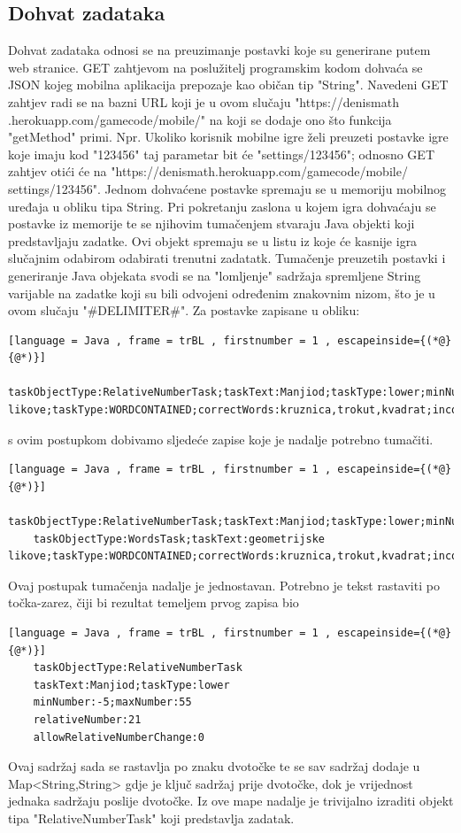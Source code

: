 \documentclass[times, utf8, zavrsni]{fer}
\begin{document}
	\subsection{Dohvat zadataka}
	Dohvat zadataka odnosi se na preuzimanje postavki koje su generirane putem web stranice. GET zahtjevom na poslužitelj programskim kodom dohvaća se JSON kojeg mobilna aplikacija prepozaje kao običan tip "String".
	Navedeni GET zahtjev radi se na bazni URL koji je u ovom slučaju "https://denismath .herokuapp.com/gamecode/mobile/" na koji se dodaje ono što funkcija "getMethod" primi. Npr. Ukoliko korisnik mobilne igre želi preuzeti postavke
	igre koje imaju kod "123456"  taj parametar bit će "settings/123456"; odnosno GET zahtjev otići će na "https://denismath.herokuapp.com/gamecode/mobile/ settings/123456".
	Jednom dohvaćene postavke spremaju se u memoriju mobilnog uređaja u obliku tipa String. Pri pokretanju zaslona u kojem igra dohvaćaju se postavke iz memorije te se njihovim tumačenjem stvaraju Java objekti koji predstavljaju zadatke.
	Ovi objekt spremaju se u listu iz koje će kasnije igra slučajnim odabirom odabirati trenutni zadatatk. Tumačenje preuzetih postavki i generiranje Java objekata svodi se na "lomljenje" sadržaja spremljene String varijable
	na zadatke koji su bili odvojeni određenim znakovnim nizom, što je u ovom slučaju "\#DELIMITER\#".
	Za postavke zapisane u obliku:
	
	
	\begin{lstlisting}[language = Java , frame = trBL , firstnumber = 1 , escapeinside={(*@}{@*)}]
	taskObjectType:RelativeNumberTask;taskText:Manjiod;taskType:lower;minNumber:-5;maxNumber:55;relativeNumber:21;allowRelativeNumberChange:0#DELIMITER#taskObjectType:WordsTask;taskText:geometrijske likove;taskType:WORDCONTAINED;correctWords:kruznica,trokut,kvadrat;incorrectWords:piramida,valjak,sfera
	\end{lstlisting}
	s ovim postupkom dobivamo sljedeće zapise koje je nadalje potrebno tumačiti.
	\begin{lstlisting}[language = Java , frame = trBL , firstnumber = 1 , escapeinside={(*@}{@*)}]
	taskObjectType:RelativeNumberTask;taskText:Manjiod;taskType:lower;minNumber:-5;maxNumber:55;relativeNumber:21;allowRelativeNumberChange:0
	taskObjectType:WordsTask;taskText:geometrijske likove;taskType:WORDCONTAINED;correctWords:kruznica,trokut,kvadrat;incorrectWords:piramida,valjak,sfera
	\end{lstlisting}
	Ovaj postupak tumačenja nadalje je jednostavan. Potrebno je tekst rastaviti po točka-zarez, čiji bi rezultat temeljem prvog zapisa bio
	\begin{lstlisting}[language = Java , frame = trBL , firstnumber = 1 , escapeinside={(*@}{@*)}]
	taskObjectType:RelativeNumberTask
	taskText:Manjiod;taskType:lower
	minNumber:-5;maxNumber:55
	relativeNumber:21
	allowRelativeNumberChange:0
	\end{lstlisting}
	Ovaj sadržaj sada se rastavlja po znaku dvotočke te se sav sadržaj dodaje u Map<String,String> gdje je ključ sadržaj prije dvotočke, dok je vrijednost jednaka sadržaju poslije dvotočke.
	Iz ove mape nadalje je trivijalno izraditi objekt tipa "RelativeNumberTask" koji predstavlja zadatak. 
\end{document}
